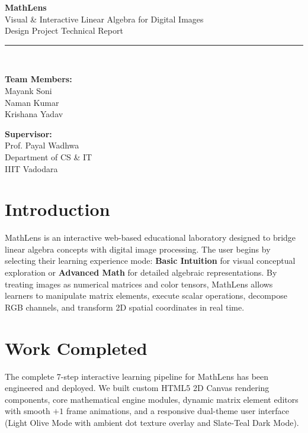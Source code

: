 \documentclass[11pt,a4paper]{article}
\begin{document}
\begin{center}
    {\Huge \textbf{MathLens}}\\[0.2cm]
    {\Large Visual \& Interactive Linear Algebra for Digital Images}\\[0.3cm]
    {\large Design Project Technical Report}\\[0.4cm]
    
    \rule{\linewidth}{0.4mm}\\[0.4cm]
    
    \begin{minipage}{0.48\textwidth}
        \begin{left} \small
            \textbf{Team Members:}\\
            Mayank Soni\\
            Naman Kumar\\
            Krishana Yadav
        \end{left}
    \end{minipage}
    \begin{minipage}{0.48\textwidth}
        \begin{right} \small
            \textbf{Supervisor:}\\
            Prof. Payal Wadhwa\\
            Department of CS \& IT\\
            IIIT Vadodara
        \end{right}
    \end{minipage}
\end{center}

\vspace{0.3cm}

\section{Introduction}
MathLens is an interactive web-based educational laboratory designed to bridge linear algebra concepts with digital image processing. The user begins by selecting their learning experience mode: \textbf{Basic Intuition} for visual conceptual exploration or \textbf{Advanced Math} for detailed algebraic representations. By treating images as numerical matrices and color tensors, MathLens allows learners to manipulate matrix elements, execute scalar operations, decompose RGB channels, and transform 2D spatial coordinates in real time.

\section{Work Completed}
The complete 7-step interactive learning pipeline for MathLens has been engineered and deployed. We built custom HTML5 2D Canvas rendering components, core mathematical engine modules, dynamic matrix element editors with smooth $+1$ frame animations, and a responsive dual-theme user interface (Light Olive Mode with ambient dot texture overlay and Slate-Teal Dark Mode).
\end{document}
